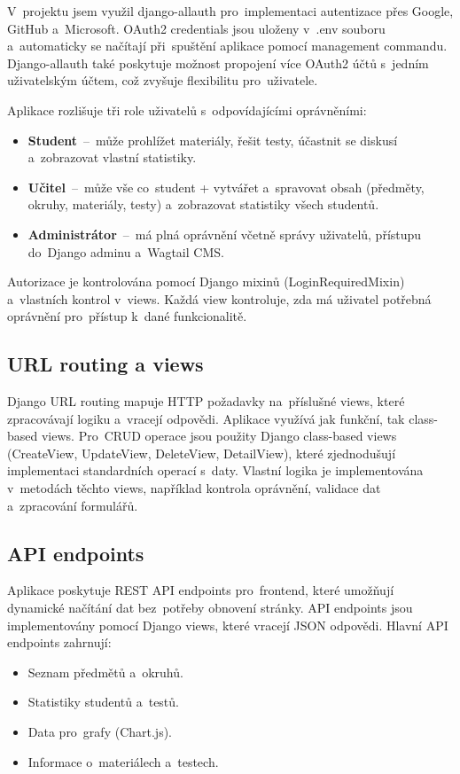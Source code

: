 \documentclass[12pt, a4paper,
twoside,
openany
]{report}
\begin{document}
	V~projektu jsem využil django-allauth pro~implementaci autentizace přes Google, GitHub a~Microsoft. OAuth2 credentials jsou uloženy v~.env souboru a~automaticky se načítají při~spuštění aplikace pomocí management commandu. Django-allauth také poskytuje možnost propojení více OAuth2 účtů s~jedním uživatelským účtem, což zvyšuje flexibilitu pro~uživatele.
	
	Aplikace rozlišuje tři role uživatelů s~odpovídajícími oprávněními:
	\begin{itemize}
		\item \textbf{Student}~--~může prohlížet materiály, řešit testy, účastnit se diskusí a~zobrazovat vlastní statistiky.
		\item \textbf{Učitel}~--~může vše co~student + vytvářet a~spravovat obsah (předměty, okruhy, materiály, testy) a~zobrazovat statistiky všech studentů.
		\item \textbf{Administrátor}~--~má plná oprávnění včetně správy uživatelů, přístupu do~Django adminu a~Wagtail CMS.
	\end{itemize}
	
	Autorizace je kontrolována pomocí Django mixinů (LoginRequiredMixin) a~vlastních kontrol v~views. Každá view kontroluje, zda má uživatel potřebná oprávnění pro~přístup k~dané funkcionalitě.

	\subsection{URL routing a views}
	
	Django URL routing mapuje HTTP požadavky na~příslušné views, které zpracovávají logiku a~vracejí odpovědi. Aplikace využívá jak funkční, tak class-based views. Pro~CRUD operace jsou použity Django class-based views (CreateView, UpdateView, DeleteView, DetailView), které zjednodušují implementaci standardních operací s~daty. Vlastní logika je implementována v~metodách těchto views, například kontrola oprávnění, validace dat a~zpracování formulářů.

	\subsection{API endpoints}
	
	Aplikace poskytuje REST API endpoints pro~frontend, které umožňují dynamické načítání dat bez~potřeby obnovení stránky. API endpoints jsou implementovány pomocí Django views, které vracejí JSON odpovědi. Hlavní API endpoints zahrnují:
	\begin{itemize}
		\item Seznam předmětů a~okruhů.
		\item Statistiky studentů a~testů.
		\item Data pro~grafy (Chart.js).
		\item Informace o~materiálech a~testech.
	\end{itemize}
\end{document}
